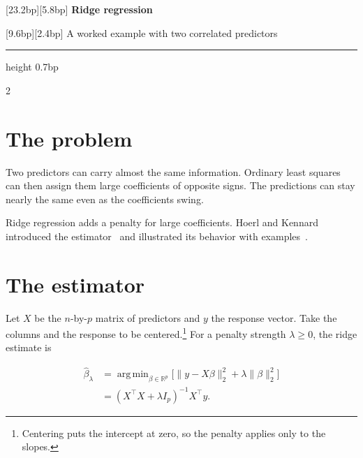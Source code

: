 \documentclass[a4paper]{article}
\DeclareMathOperator*{\argmin}{arg\,min}
\begin{document}
\raggedright
\fontsize{10.5bp}{14bp}\selectfont
\setlength{\abovedisplayskip}{9bp}
\setlength{\belowdisplayskip}{9bp}
\setlength{\abovedisplayshortskip}{9bp}
\setlength{\belowdisplayshortskip}{9bp}

\noindent\raisebox{0pt}[23.2bp][5.8bp]{%
  \fontsize{29bp}{29bp}\selectfont\bfseries Ridge regression}%
\par
\vspace{10bp}
\nointerlineskip
\noindent\raisebox{0pt}[9.6bp][2.4bp]{%
  \fontsize{12bp}{12bp}\selectfont\color{accent}%
  A worked example with two correlated predictors}%
\par
\vspace{16bp}
{\color{accent}\hrule height 0.7bp}

\raggedcolumns
\begin{multicols}{2}
\setlength{\parskip}{3.5bp}

\section*{The problem}

Two predictors can carry almost the same information. Ordinary least squares
can then assign them large coefficients of opposite signs. The predictions can
stay nearly the same even as the coefficients swing.

Ridge regression adds a penalty for large coefficients. Hoerl and Kennard
introduced the estimator~\cite{hoerl-estimator} and illustrated its behavior with
examples~\cite{hoerl-applications}.

\section*{The estimator}

Let \(X\) be the \(n\)-by-\(p\) matrix of predictors and \(y\) the response vector.
Take the columns and the response to be centered.\footnote{%
  Centering puts the intercept at zero, so the penalty applies only to the
  slopes.%
} For a penalty strength \(\lambda \ge 0\), the ridge estimate is

\begin{equation}
  \label{ridge}
  \begin{aligned}
    \hat{\beta}_\lambda
      &= \argmin_{\beta \in \mathbb{R}^p}
         \bigl[\lVert y - X\beta\rVert_2^2 + \lambda\lVert\beta\rVert_2^2\bigr] \\
      &= (X^\top X + \lambda I_p)^{-1} X^\top y.
  \end{aligned}
\end{equation}


\end{multicols}
\end{document}
